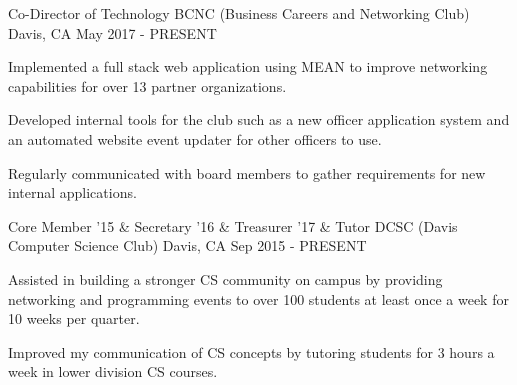 

\begin{cventries}


  \cventry
  {Co-Director of Technology} %
  {BCNC (Business Careers and Networking Club)} %
  {Davis, CA} %
  {May 2017 - PRESENT} %
  {
    \begin{cvitems} %
      \item {Implemented a full stack web application using MEAN to improve networking capabilities for over 13 partner organizations.}
      \item {Developed internal tools for the club such as a new officer application system and an automated website event updater for other officers to use.}
      \item {Regularly communicated with board members to gather requirements for new internal applications.}
    \end{cvitems}
  }
  \cventry
    {Core Member '15 \& Secretary '16 \& Treasurer '17 \& Tutor} %
    {DCSC (Davis Computer Science Club)} %
    {Davis, CA} %
    {Sep 2015 - PRESENT} %
    {
      \begin{cvitems} %
        \item {Assisted in building a stronger CS community on campus by providing networking and programming events to over 100 students at least once a week for 10 weeks per quarter.}
        \item {Improved my communication of CS concepts by tutoring students for 3 hours a week in lower division CS courses.}
      \end{cvitems}
    }

\end{cventries}
